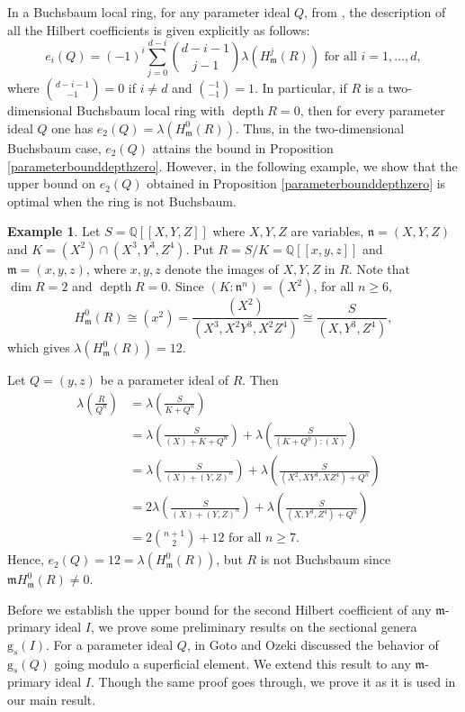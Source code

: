 \documentclass[reqno,a4paper,dvipsnames]{amsart}
\newcommand{\m}{\mathfrak{m} }
\newcommand{\n}{\mathfrak{n} }
\newcommand{\depth}{\operatorname{depth}}
\theoremstyle{definition}
\newtheorem{example}[theorem]{Example}
\begin{document}
In a Buchsbaum local ring, for any parameter ideal $Q$, from \cite[Corollary 4.2]{trung3}, the description of all the Hilbert coefficients is given explicitly as follows: 
$$e_{i}(Q)=(-1)^i\displaystyle\sum_{j=0}^{d-i}\binom{d-i-1}{j-1}\lambda\left(H_{\mathfrak m}^{j}(R)\right) \text{ for all $i=1,\ldots,d$},$$
where $\binom{d-i-1}{-1}=0$ if $i \neq d$ and $\binom{-1}{-1}=1.$
In particular, if $R$ is a two-dimensional Buchsbaum local ring with $\depth R = 0$, then for every parameter ideal $Q$ one has $e_{2}(Q)=\lambda\left(H_{\mathfrak m}^{0}(R)\right)$. Thus, in the two-dimensional Buchsbaum case, $e_{2}(Q)$ attains the bound  in Proposition \ref{parameterbounddepthzero}. However, in the following example, we show that the upper bound  on $e_{2}(Q)$ obtained in Proposition \ref{parameterbounddepthzero} is optimal when the ring is not Buchsbaum.
\begin{example}
\label{ex vanishing e_2}
    Let  $S =\mathbb Q[[X,Y,Z]]$ where $X,Y,Z$ are variables,   $\mathfrak n = (X,Y,Z)$ and $K =
    (X^2) \cap (X^3,Y^3,Z^4)$. 
     Put  $R=S/K= \mathbb Q[[x,y,z]]$ and $\m=(x,y,z)$,  where $x,y,z$ denote the images of $X,Y,Z$ in $R.$  Note that $\dim R=2$  and  $\depth R=0.$  Since  $(K : \n^n) = (X^2)$, for all $n\geq 6,$  
    $$H_{\m}^{0}(R)\cong (x^2)
    = \dfrac{(X^2)}{ (X^3,X^2Y^3,X^2Z^4) }  
    \cong \dfrac{S}{ (X,Y^3,Z^4)},$$
    which gives $\lambda\left(H_{\m}^{0}(R)\right)=12.$

    Let $Q=(y,z)$  be a parameter ideal of $R.$  Then 
 \begin{align*}
\lambda \left( \frac{R}{Q^n}\right)
&= \lambda \left( \frac{S}{ K + Q^n}\right) & \\
&= \lambda \left( \frac{S}{  (X) + K + Q^n}\right) + \lambda \left( \frac{S}{   (K + Q^n) : (X)}\right) & \\
&= \lambda \left( \frac{S}{  (X) + (Y,Z)^n}\right) + \lambda \left( \frac{S}{   ( X^2, XY^3, XZ^4) + Q^n}\right) & \\
&= 2 \lambda \left( \frac{S}{  (X) + (Y,Z)^n}\right) + \lambda \left( \frac{S}{   ( X, Y^3, Z^4 ) + Q^n}\right) & \\
&= 2\binom{n+1}{2}+12  \mbox{ for all } n \geq 7.
 \end{align*}  
 Hence,
       $e_{2}(Q) = 12= \lambda\left(H_{\m}^{0}(R)\right)$, but $R$ is not Buchsbaum since $\m H^{0}_{\m}(R) \neq 0$.  
\end{example}



Before we establish the upper bound for the second Hilbert coefficient of any $\m$-primary ideal $I$, we prove some preliminary results
 on the sectional genera $\mathrm{g}_s(I).$ For a parameter ideal $Q$, in 
 \cite[Lemma 3.2]{go}  Goto and Ozeki discussed the behavior of $\mathrm{g}_s(Q)$  going modulo a superficial element. We extend this result to any  $\m$-primary ideal $I$. 
Though the same proof goes through, we prove it as it is used in our main result.  
\end{document}
